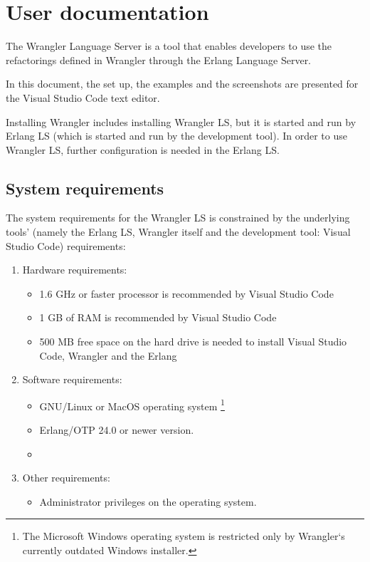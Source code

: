 \chapter{User documentation}
\label{ch:user}

The Wrangler Language Server is a tool that enables developers to use the refactorings defined in Wrangler through the Erlang Language Server.

In this document, the set up, the examples and the screenshots are presented for the Visual Studio Code text editor.

Installing Wrangler includes installing Wrangler LS, but it is started and run by Erlang LS (which is started and run by the development tool).
In order to use Wrangler LS, further configuration is needed in the Erlang LS.

\section{System requirements}

The system requirements for the Wrangler LS is constrained by the underlying tools' (namely the Erlang LS, Wrangler itself and the development tool: Visual Studio Code) requirements:

\begin{enumerate}
    \item Hardware requirements: 
    \begin{itemize}
        \item 1.6 GHz or faster processor is recommended by Visual Studio Code 
        \cite{VSCodeRequirements}
        \item 1 GB of RAM is recommended by Visual Studio Code  \cite{VSCodeRequirements}
        \item 500 MB free space on the hard drive is needed to install Visual Studio Code, Wrangler and the Erlang
    \end{itemize}
    \item Software requirements:
    \begin{itemize}
        \item GNU/Linux or MacOS operating system \footnote{The Microsoft Windows operating system is restricted only by Wrangler`s currently outdated Windows installer.}
        \item Erlang/OTP 24.0 or newer version.
        \item {}
    \end{itemize}
    \item Other requirements:
    \begin{itemize}
        \item Administrator privileges on the operating system.
    \end{itemize}
\end{enumerate}


